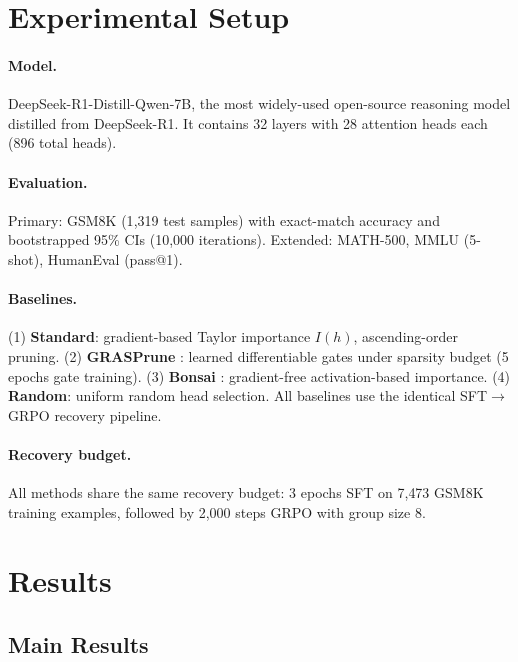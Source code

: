 \documentclass[11pt]{article}
\begin{document}
\section{Experimental Setup}
\label{sec:setup}

\paragraph{Model.}
DeepSeek-R1-Distill-Qwen-7B, the most widely-used open-source reasoning model distilled from DeepSeek-R1.
It contains 32 layers with 28 attention heads each (896 total heads).

\paragraph{Evaluation.}
Primary: GSM8K (1{,}319 test samples) with exact-match accuracy and bootstrapped 95\% CIs (10{,}000 iterations).
Extended: MATH-500, MMLU (5-shot), HumanEval (pass@1).

\paragraph{Baselines.}
(1) \textbf{Standard}: gradient-based Taylor importance $I(h)$, ascending-order pruning.
(2) \textbf{GRASPrune} \citep{graspune2026}: learned differentiable gates under sparsity budget (5 epochs gate training).
(3) \textbf{Bonsai} \citep{bonsai2025}: gradient-free activation-based importance.
(4) \textbf{Random}: uniform random head selection.
All baselines use the identical SFT$\to$GRPO recovery pipeline.

\paragraph{Recovery budget.}
All methods share the same recovery budget: 3 epochs SFT on 7{,}473 GSM8K training examples, followed by 2{,}000 steps GRPO with group size 8.


\section{Results}
\label{sec:results}

\subsection{Main Results}
\label{sec:main_results}
\end{document}
